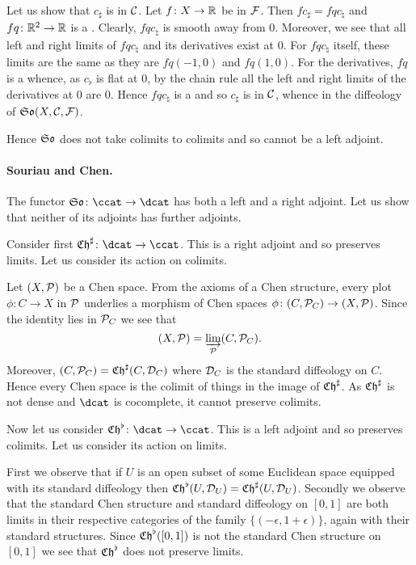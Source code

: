\documentclass[%
12pt,%
arxiv,%
defaults
]{myclass}
\begin{document}
Let us show that \(c_\sharp\) is in \(\mathcal{C}\).
Let \(f \colon X \to \mathbb{R}\) be in \(\mathcal{F}\).
Then
 \(f c_\sharp = f q c_\natural\)
and
 \(f q \colon \mathbb{R}^2 \to \mathbb{R}\)
is a \cimap.
Clearly, \(f q c_\natural\) is smooth away from \(0\).
Moreover, we see that all left and right limits of \(f q c_\natural\) and its derivatives exist at \(0\).
For \(f q c_\natural\) itself, these limits are the same as they are \(f q(-1, 0)\) and \(f q(1, 0)\).
For the derivatives, \(f q\) is a \cimap whence, as \(c_\flat\) is flat at \(0\), by the chain rule all the left and right limits of the derivatives at \(0\) are \(0\).
Hence \(f q c_\natural\) is a \cimap and so \(c_\sharp\) is in \(\mathcal{C}\), whence in the diffeology of \(\FrSo(X, \m{C}, \m{F})\).

Hence \(\FrSo\) does not take colimits to colimits and so cannot be a left adjoint.

\paragraph{Souriau and Chen.}
The functor \(\ChSo \colon \ccat \to \dcat\) has both a left and a right adjoint.
Let us show that neither of its adjoints has further adjoints.

Consider first \(\SoCht \colon \dcat \to \ccat\).
This is a right adjoint and so preserves limits.
Let us consider its action on colimits.

Let \((X, \mathcal{P})\) be a Chen space.
From the axioms of a Chen structure, every plot \(\phi \colon C \to X\) in \(\mathcal{P}\) underlies a morphism of Chen spaces \(\phi \colon (C, \mathcal{P}_C) \to (X, \mathcal{P})\).
Since the identity lies in \(\mathcal{P}_C\) we see that
%
\[
  (X, \mathcal{P}) = \varinjlim_{\mathcal{P}} (C, \mathcal{P}_C).
\]
%
Moreover, \((C, \m{P}_C) = \SoCht(C, \m{D}_C)\) where \(\mathcal{D}_C\) is the standard diffeology on \(C\).
Hence every Chen space is the colimit of things in the image of \(\SoCht\).
As \(\SoCht\) is not dense and \(\dcat\) is cocomplete, it cannot preserve colimits.

Now let us consider \(\SoChb \colon \dcat \to \ccat\).
This is a left adjoint and so preserves colimits.
Let us consider its action on limits.

First we observe that if \(U\) is an open subset of some Euclidean space equipped with its standard diffeology then \(\SoChb(U, \m{D}_U) = \SoCht(U, \m{D}_U)\).
Secondly we observe that the standard Chen structure and standard diffeology on \([0,1]\) are both limits in their respective categories of the family \(\{(-\epsilon, 1 + \epsilon)\}\), again with their standard structures.
Since \(\SoChb([0,1])\) is not the standard Chen structure on \([0,1]\) we see that \(\SoChb\) does not preserve limits.
\end{document}
